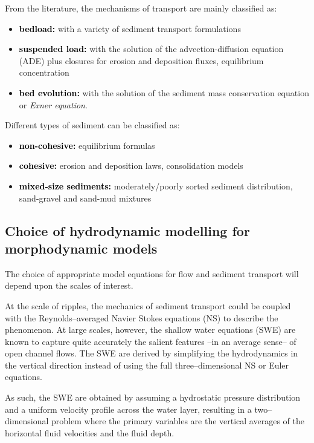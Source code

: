\noindent
From the literature, the mechanisms of transport are mainly classified as:
\begin{itemize}
\item \textcolor{black}{\bf bedload:} with a variety of sediment transport formulations
\item \textcolor{black}{\bf suspended load:} with the solution of the advection-diffusion equation (ADE) plus closures for erosion and deposition fluxes, equilibrium concentration
\item \textcolor{black}{\bf bed evolution:} with the solution of the sediment mass conservation equation or \textit{Exner equation}.
\end{itemize}

\noindent
Different types of sediment can be classified as:
\begin{itemize}
\item \textcolor{black}{\bf non-cohesive:} equilibrium formulas
\item \textcolor{black}{\bf cohesive:} erosion and deposition laws, consolidation models
\item \textcolor{black}{\bf mixed-size sediments:} moderately/poorly sorted sediment distribution, sand-gravel and sand-mud mixtures
\end{itemize}
\noindent


\subsection{Choice of hydrodynamic modelling for morphodynamic models}
The choice of appropriate model equations for flow and sediment transport
will depend upon the scales of interest.

At the scale of ripples, the mechanics of sediment transport could be coupled with the
Reynolds--averaged Navier Stokes equations (NS) to describe the phenomenon.
At large scales, however, the shallow water equations (SWE) are known to
capture quite accurately the salient features --in an average sense-- of
open channel flows. The SWE are derived by simplifying the hydrodynamics in the vertical
direction instead of using the full three--dimensional NS or Euler
equations.

As such, the SWE are obtained by assuming a hydrostatic pressure
distribution and a uniform velocity profile across the water layer,
resulting in a two--dimensional problem where the primary variables are the
vertical averages of the horizontal fluid velocities and the fluid depth.


